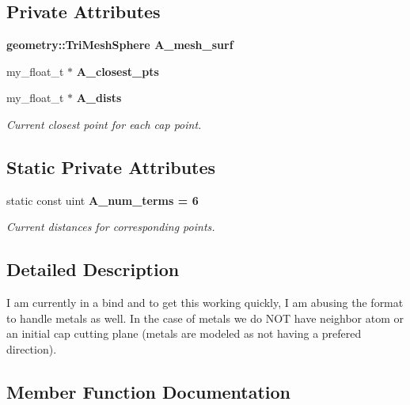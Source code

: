 \subsection*{Private Attributes}
\begin{CompactItemize}
\item 
\bf{geometry::Tri\-Mesh\-Sphere} \textbf{A\_\-mesh\_\-surf}\label{classASCbase_1_1model__hbond__surf__t_64c41345670808e5f52e8b01661330e3}

\item 
my\_\-float\_\-t $\ast$ \textbf{A\_\-closest\_\-pts}\label{classASCbase_1_1model__hbond__surf__t_9146d87c587720dc5f4b1a26061e68e7}

\item 
my\_\-float\_\-t $\ast$ \bf{A\_\-dists}\label{classASCbase_1_1model__hbond__surf__t_fe16dd162d555d9c018561573a463aaf}

\begin{CompactList}\small\item\em Current closest point for each cap point. \item\end{CompactList}\end{CompactItemize}
\subsection*{Static Private Attributes}
\begin{CompactItemize}
\item 
static const uint \bf{A\_\-num\_\-terms} = 6\label{classASCbase_1_1model__hbond__surf__t_7e554d42744ddf3ab7903a73937e3aeb}

\begin{CompactList}\small\item\em Current distances for corresponding points. \item\end{CompactList}\end{CompactItemize}


\subsection{Detailed Description}
I am currently in a bind and to get this working quickly, I am abusing the format to handle metals as well. In the case of metals we do NOT have neighbor atom or an initial cap cutting plane (metals are modeled as not having a prefered direction). 



\subsection{Member Function Documentation}
